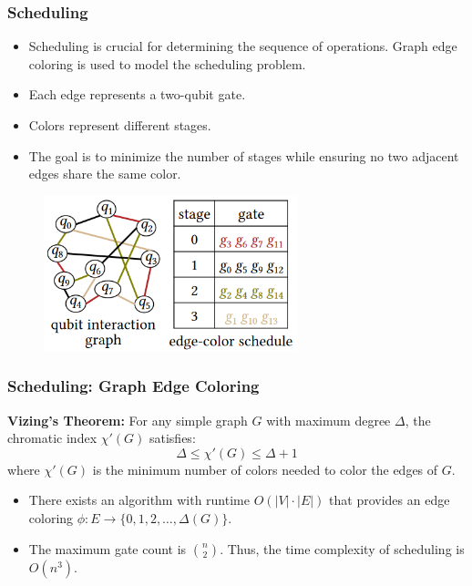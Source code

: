 \documentclass[18 pt]{beamer}
\begin{document}
\begin{frame}
    \frametitle{Scheduling}
    \begin{itemize}
        \item Scheduling is crucial for determining the sequence of operations. Graph edge coloring is used to model the scheduling problem.
        \item Each edge represents a two-qubit gate.
        \item Colors represent different stages.
        \item The goal is to minimize the number of stages while ensuring no two adjacent edges share the same color.
    \end{itemize}
    \begin{figure}
        \includegraphics[height=4.5cm]{color.png}
    \end{figure}
    
\end{frame}

\begin{frame}
    \frametitle{Scheduling: Graph Edge Coloring}
    \begin{theorem}
        \textbf{Vizing's Theorem:} For any simple graph \( G \) with maximum degree \( \Delta \), the chromatic index \(\chi'(G)\) satisfies:
\[
\Delta \leq \chi'(G) \leq \Delta + 1
\]
where \(\chi'(G)\) is the minimum number of colors needed to color the edges of \( G \).

    \end{theorem}
    \begin{itemize}
        \item There exists an algorithm with runtime \( O(|V| \cdot |E|) \) that provides an edge coloring \(\phi: E \to \{0, 1, 2, \dots, \Delta(G)\}\).
        \item The maximum gate count is \( \binom{n}{2} \). Thus, the time complexity of scheduling is \( O(n^3) \).
    \end{itemize}    
\end{frame}
\end{document}
